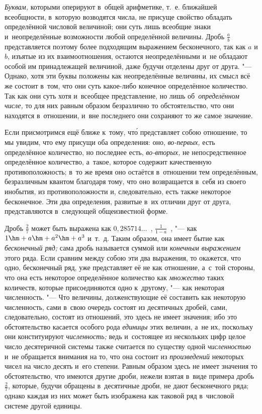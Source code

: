 {\em Буквам,} которыми оперируют в~общей арифметике, т.~е. ближайшей
всеобщности, в~которую возводятся числа, не присуще свойство обладать
определённой числовой величиной; они суть лишь всеобщие знаки и~неопределённые
возможности любой определённой величины. Дробь $\frac a b$ представляется
поэтому более подходящим выражением бесконечного, так как $a$ и $b$,
изъятые из их взаимоотношения, остаются неопределёнными и~не обладают особой им
принадлежащей величиной, даже будучи отделены друг от друга. "--- Однако, хотя
эти буквы положены как неопределённые величины, их смысл всё же состоит в~том,
что они суть какое-либо конечное определённое количество. Так как они суть хотя
и~всеобщее представление, но лишь об~{\em определённом числе,} то для них
равным образом безразлично то обстоятельство, что они находятся в~отношении,
и~вне последнего они сохраняют то же самое значение.

Если присмотримся ещё ближе к~тому, чт\'{о} представляет собою отношение, то мы
увидим, что ему присущи оба определения: оно, {\em во-первых,} есть
определённое количество, но последнее есть, {\em во-вторых,} не
непосредственное определённое количество, а~такое, которое содержит качественную
противоположность; в~то же время оно остаётся в~отношении тем определённым,
безразличным квантом благодаря тому, что оно возвращается в~себя из
своего инобытия, из противоположности и, следовательно, есть также
некоторое бесконечное. Эти два определения, развитые в~их отличии друг от
друга, представляются в~следующей общеизвестной форме.

Дробь $\frac 2 7$ может быть выражена как $0{,}285714\ldots$~,
$\frac 1{1-a}$~, "--- как $1\hm+a\hm+a^2\hm+a^3$ и~т.~д. Таким образом, она
имеет бытие как {\em бесконечный ряд;} сама дробь называется суммой
или {\em конечным выражением} этого ряда. Если сравним между собою эти два
выражения, то окажется, что одно, бесконечный ряд, уже представляет её не как
отношение, а~с~той стороны, что она есть некоторое определённое количество как
{\em множество} таких количеств, которые присоединяются одно к~другому, "---
как некоторая численность. "--- Что величины, долженствующие её составить как
некоторую численность, сами в~свою очередь состоят из десятичных дробей, сами,
следовательно, состоят из отношений, это здесь не имеет значения; ибо это
обстоятельство касается особого рода {\em единицы} этих величин, а~не их,
поскольку они конституируют {\em численность;} ведь и~состоящее из нескольких
цифр целое число десятеричной системы также считается по существу одной
{\em численностью} и~не обращается внимания на то, что она состоит из
{\em произведений} некоторых чисел на число десять и~его степени. Равным
образом здесь не имеет значения то обстоятельство, что имеются другие дроби,
нежели взятая в~виде примера дробь $\frac 2 7$, которые, будучи обращены
в~десятичные дроби, не дают бесконечного ряда; однако каждая из них может быть
изображена как таковой ряд в~числовой системе другой единицы.

